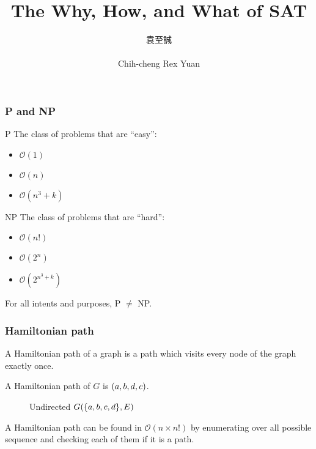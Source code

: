 \documentclass{beamer}
\date{\displaydate{date}}
\title[SAT]{The Why, How, and What of SAT}
\author[Rex]{\begin{CJK}{UTF8}{bsmi}袁至誠\end{CJK}\\Chih-cheng Rex Yuan}
\institute[at SZU]{Shenzhen University}
\DeclarePairedDelimiter{\set}{\{}{\}}
\DeclarePairedDelimiter{\tuple}{(}{)}
\newcommand{\sgraph}[1]{G(#1)}
\newcommand{\bigo}[1]{\mathcal{O}(#1)}
\begin{document}
\begin{frame}
\titlepage
\end{frame}

\begin{frame}
    \frametitle{P and NP}
    \alert{P} The class of problems that are ``easy'':
    \begin{itemize}
        \item $\bigo{1}$
        \item $\bigo{n}$
        \item $\bigo{n^3 + k}$
    \end{itemize}

    \alert{NP} The class of problems that are ``hard'':
    \begin{itemize}
        \item $\bigo{n!}$
        \item $\bigo{2^n}$
        \item $\bigo{2^{n^3+k}}$
    \end{itemize}

    For all intents and purposes, P $\neq$ NP.
\end{frame}

\begin{frame}
    \frametitle{Hamiltonian path}
    A Hamiltonian path of a graph is a path which visits every
    node of the graph exactly once.

    A Hamiltonian path of $G$ is $\tuple{a,b,d,c}$.
    \begin{figure}[H]
        \centering
        \caption{Undirected $\sgraph{\set{a,b,c,d}, E}$}
        \label{figure:posetp}
    \end{figure}

    A Hamiltonian path can be found in $\bigo{n \times n!}$ by enumerating
    over all possible sequence and checking each of them if it is a path.
\end{frame}
\end{document}
